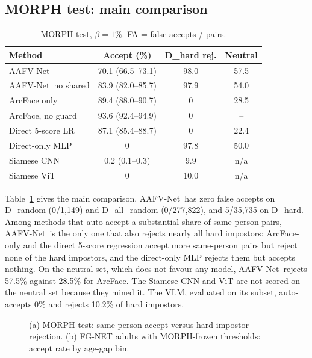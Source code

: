 \documentclass[10pt, a4paper, twocolumn]{article}
\newcommand{\sys}{AAFV-Net}
\begin{document}
\subsection{MORPH test: main comparison}
\begin{table}[h]
\centering\small
\caption{MORPH test, $\beta=1\%$. FA = false accepts / pairs.}
\label{tab:main}
\setlength{\tabcolsep}{2pt}\footnotesize
\begin{tabular}{@{}lccc@{}}
\toprule
Method & Accept (\%) & D\_hard rej. & Neutral\\\midrule
\sys & 70.1 (66.5--73.1) & 98.0 & 57.5\\
\sys\ no shared & 83.9 (82.0--85.7) & 97.9 & 54.0\\
ArcFace only & 89.4 (88.0--90.7) & 0 & 28.5\\
ArcFace, no guard & 93.6 (92.4--94.9) & 0 & --\\
Direct 5-score LR & 87.1 (85.4--88.7) & 0 & 22.4\\
Direct-only MLP & 0 & 97.8 & 50.0\\
Siamese CNN & 0.2 (0.1--0.3) & 9.9 & n/a\\
Siamese ViT & 0 & 10.0 & n/a\\\bottomrule
\end{tabular}
\end{table}
Table~\ref{tab:main} gives the main comparison. \sys\ has zero false accepts on D\_random (0/1{,}149) and D\_all\_random (0/277{,}822), and 5/35{,}735 on D\_hard. Among methods that auto-accept a substantial share of same-person pairs, \sys\ is the only one that also rejects nearly all hard impostors: ArcFace-only and the direct 5-score regression accept more same-person pairs but reject none of the hard impostors, and the direct-only MLP rejects them but accepts nothing. On the neutral set, which does not favour any model, \sys\ rejects 57.5\% against 28.5\% for ArcFace. The Siamese CNN and ViT are not scored on the neutral set because they mined it. The VLM, evaluated on its subset, auto-accepts 0\% and rejects 10.2\% of hard impostors. 

\begin{figure}[h]
\centering
{}
\caption{(a) MORPH test: same-person accept versus hard-impostor rejection. (b) FG-NET adults with MORPH-frozen thresholds: accept rate by age-gap bin.}
\label{fig:results}
\end{figure}
\end{document}

